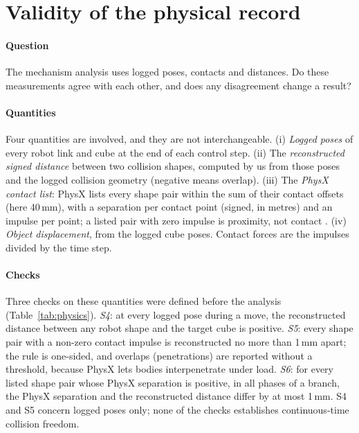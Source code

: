 \section{Validity of the physical record}\label{sec:physics}

\paragraph{Question} The mechanism analysis uses logged poses, contacts and distances. Do these measurements agree with each other, and does any disagreement change a result?

\paragraph{Quantities} Four quantities are involved, and they are not interchangeable. (i) \emph{Logged poses} of every robot link and cube at the end of each control step. (ii) The \emph{reconstructed signed distance} between two collision shapes, computed by us from those poses and the logged collision geometry (negative means overlap). (iii) The \emph{PhysX contact list}: PhysX lists every shape pair within the sum of their contact offsets (here 40\,mm), with a separation per contact point (signed, in metres) and an impulse per point; a listed pair with zero impulse is proximity, not contact \cite{nvidia_physx_contact}. (iv) \emph{Object displacement}, from the logged cube poses. Contact forces are the impulses divided by the time step.

\paragraph{Checks} Three checks on these quantities were defined before the analysis (Table~\ref{tab:physics}). \emph{S4}: at every logged pose during a move, the reconstructed distance between any robot shape and the target cube is positive. \emph{S5}: every shape pair with a non-zero contact impulse is reconstructed no more than 1\,mm apart; the rule is one-sided, and overlaps (penetrations) are reported without a threshold, because PhysX lets bodies interpenetrate under load. \emph{S6}: for every listed shape pair whose PhysX separation is positive, in all phases of a branch, the PhysX separation and the reconstructed distance differ by at most 1\,mm. S4 and S5 concern logged poses only; none of the checks establishes continuous-time collision freedom.

